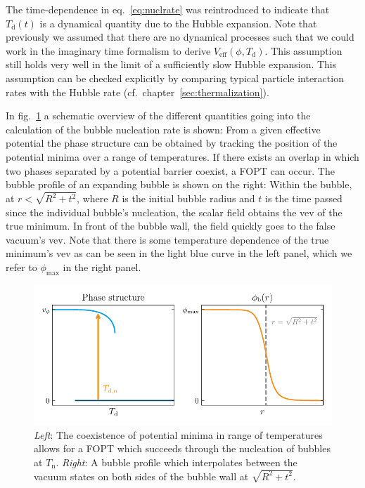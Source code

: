 The time-dependence in eq.~\eqref{eq:nuclrate} was reintroduced to indicate that $T_\text{d}(t)$ is a dynamical quantity due to the Hubble expansion. Note that previously we assumed that there are no dynamical processes such that we could work in the imaginary time formalism to derive $V_\text{eff}(\phi, T_\text{d})$.  This assumption still holds very well in the limit of a sufficiently slow Hubble expansion. This assumption can be checked explicitly by comparing typical particle interaction rates with the Hubble rate (cf.~chapter~\ref{sec:thermalization}).

In fig.~\ref{fig:phases} a schematic overview of the different quantities going into the calculation of the bubble nucleation rate is shown: From a given effective potential the phase structure can be obtained by tracking the position of the potential minima over a range of temperatures. If there exists an overlap in which two phases separated by a potential barrier coexist, a \ac{FOPT} can occur. The bubble profile of an expanding bubble is shown on the  right: Within the bubble, at $r<\sqrt{R^2 + t^2}$, where $R$ is the initial bubble radius and $t$ is the time passed since the individual bubble's nucleation, the scalar field obtains the \ac{vev} of the true minimum. In front of the bubble wall, the field quickly goes to the false vacuum's \ac{vev}. Note that there is some temperature dependence of the true minimum's \ac{vev} as can be seen in the light blue curve in the left panel, which we refer to $\phi_\text{max}$ in the right panel.

\begin{figure}[t]
	\centering
	\includegraphics[width=\linewidth]{thesisplots/phases/phases}
	\caption{
		\textit{Left}: The coexistence of potential minima in range of temperatures allows for a \ac{FOPT} which succeeds through the nucleation of bubbles at $T_\text{n}$. \textit{Right}: A bubble profile which interpolates between the vacuum states on both sides of the bubble wall at $\sqrt{R^2 + t^2}$.
		}
	\label{fig:phases}
\end{figure}

